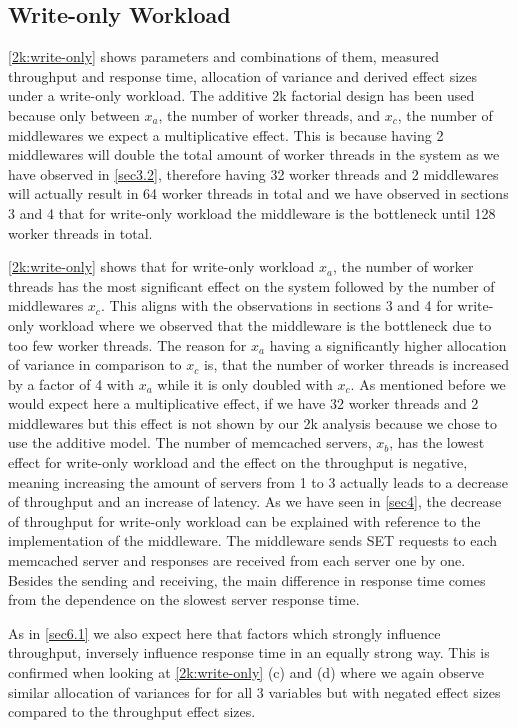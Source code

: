 \documentclass[11pt,a4paper]{article}
\begin{document}
\subsection{Write-only Workload}\label{sec6.2}
\autoref{2k:write-only} shows parameters and combinations of them, measured throughput and response time, allocation of variance and derived effect sizes under a write-only workload. The additive 2k factorial design has been used because only between $x_a$, the number of worker threads, and $x_c$, the number of middlewares we expect a multiplicative effect. This is because having 2 middlewares will double the total amount of worker threads in the system as we have observed in \autoref{sec3.2}, therefore having 32 worker threads and 2 middlewares will actually result in 64 worker threads in total and we have observed in sections 3 and 4 that for write-only workload the middleware is the bottleneck until 128 worker threads in total.

\autoref{2k:write-only} shows that for write-only workload $x_a$, the number of worker threads has the most significant effect on the system followed by the number of middlewares $x_c$. This aligns with the observations in sections 3 and 4 for write-only workload where we observed that the middleware is the bottleneck due to too few worker threads. The reason for $x_a$ having a significantly higher allocation of variance in comparison to $x_c$ is, that the number of worker threads is increased by a factor of 4 with $x_a$ while it is only doubled with $x_c$. As mentioned before we would expect here a multiplicative effect, if we have 32 worker threads and 2 middlewares but this effect is not shown by our 2k analysis because we chose to use the additive model.
The number of memcached servers, $x_b$, has the lowest effect for write-only workload and the effect on the throughput is negative, meaning increasing the amount of servers from 1 to 3 actually leads to a decrease of throughput and an increase of latency. 
As we have seen in \autoref{sec4}, the decrease of throughput for write-only workload can be explained with reference to the implementation of the middleware. The middleware sends SET requests to each memcached server and responses are received from each server one by one. Besides the sending and receiving, the main difference in response time comes from the dependence on the slowest server response time.

As in \autoref{sec6.1} we also expect here that factors which strongly influence throughput, inversely influence response time in an equally strong way. This is confirmed when looking at \autoref{2k:write-only} (c) and (d) where we again observe similar allocation of variances for for all 3 variables but with negated effect sizes compared to the throughput effect sizes.
\end{document}
